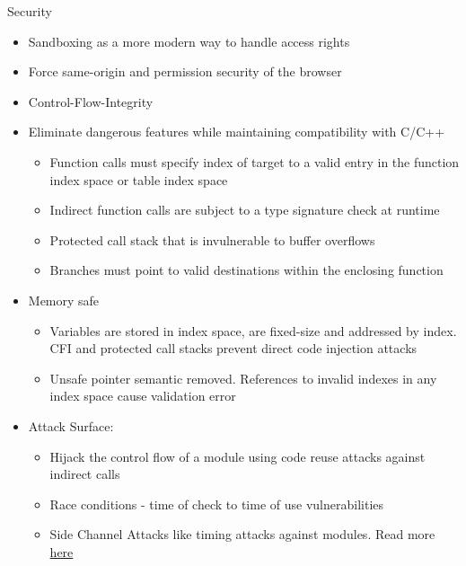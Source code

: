 \documentclass{beamer}
\begin{document}
\begin{frame}{Security}
    \begin{itemize}
        \item Sandboxing as a more modern way to handle access rights
        \item Force same-origin and permission security of the browser
        \item Control-Flow-Integrity
        \item Eliminate dangerous features while maintaining compatibility with C/C++
              \begin{itemize}
                  \item Function calls must specify index of target to a valid entry in the function index space or table index space
                  \item Indirect function calls are subject to a type signature check at runtime
                  \item Protected call stack that is invulnerable to buffer overflows
                  \item Branches must point to valid destinations within the enclosing function
              \end{itemize}
        \item Memory safe
              \begin{itemize}
                  \item Variables are stored in index space, are fixed-size and addressed by index. CFI and protected call stacks prevent direct code injection attacks
                  \item Unsafe pointer semantic removed. References to invalid indexes in any index space cause validation error
              \end{itemize}
        \item Attack Surface:
              \begin{itemize}
                  \item Hijack the control flow of a module using code reuse attacks against indirect calls
                  \item Race conditions - time of check to time of use vulnerabilities
                  \item Side Channel Attacks like timing attacks against modules. Read more \href{https://github.com/tc39/ecmascript_sharedmem/blob/master/issues/TimingAttack.md}{here}
              \end{itemize}
    \end{itemize}
\end{frame}
\end{document}
